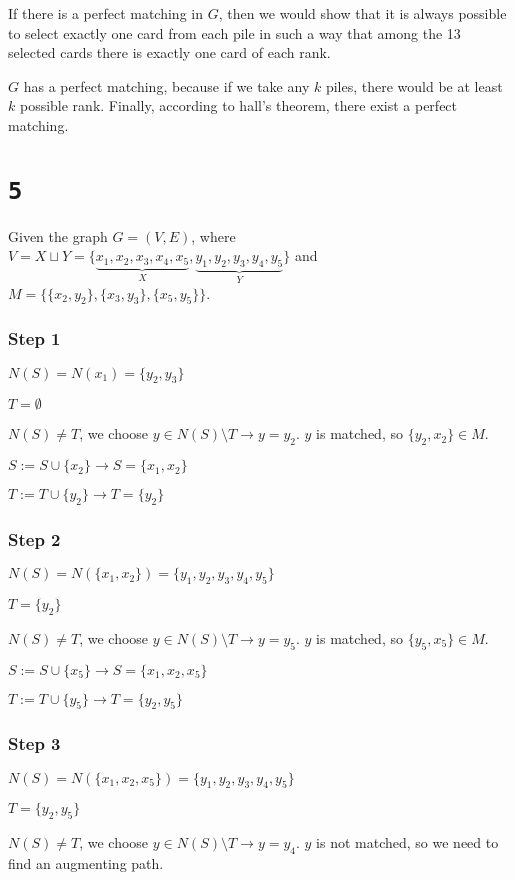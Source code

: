 \documentclass[a4paper,11pt]{report}
\begin{document}
If there is a perfect matching in $G$, then we  would show that it is always
possible to select exactly one card from each pile in such a way that among
the 13 selected cards there is exactly one card of each rank.

$G$ has a perfect matching, because if we take any $k$ piles, there would be at
least $k$ possible rank. Finally, according to hall's theorem, there exist a
perfect matching.

\section*{\texttt{5}}

Given the graph $G = (V,E)$, where $V = X \sqcup Y =
\{\underbrace{x_1,x_2,x_3,x_4,x_5}_X,\underbrace{y_1,y_2,y_3,y_4,y_5}_Y\}$ and
$M = \{\{x_2,y_2\},\{x_3,y_3\},\{x_5,y_5\}\}$.

\subsubsection*{Step 1}
$N(S) = N(x_1) = \{y_2,y_3\}$

$T = \emptyset$

$N(S) \neq T$, we choose $y \in N(S) \setminus T \rightarrow y = y_2$. $y$ is
matched, so $\{y_2,x_2\} \in M$.

$S := S \cup \{x_2\} \rightarrow S = \{x_1,x_2\}$

$T := T \cup \{y_2\} \rightarrow T = \{y_2\}$

\subsubsection*{Step 2}
$N(S) = N(\{x_1,x_2\}) = \{y_1,y_2,y_3,y_4,y_5\}$

$T = \{y_2\}$

$N(S) \neq T$, we choose $y \in N(S) \setminus T \rightarrow y = y_5$. $y$ is
matched, so $\{y_5,x_5\} \in M$.

$S := S \cup \{x_5\} \rightarrow S = \{x_1,x_2,x_5\}$

$T := T \cup \{y_5\} \rightarrow T = \{y_2,y_5\}$

\subsubsection*{Step 3}
$N(S) = N(\{x_1,x_2,x_5\}) = \{y_1,y_2,y_3,y_4,y_5\}$

$T = \{y_2,y_5\}$

$N(S) \neq T$, we choose $y \in N(S) \setminus T \rightarrow y = y_4$. $y$ is
not matched, so we need to find an augmenting path.
\end{document}
